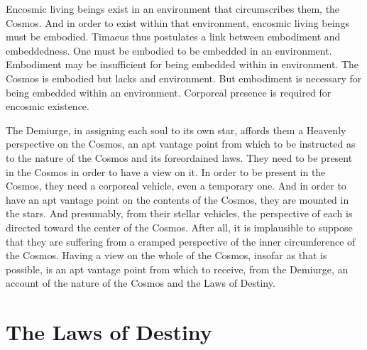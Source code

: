 Encosmic living beings exist in an environment that circumscribes them, the Cosmos. And in order to exist within that environment, encosmic living beings must be embodied. Timaeus thus postulates a link between embodiment and embeddedness. One must be embodied to be embedded in an environment. Embodiment may be insufficient for being embedded within in environment. The Cosmos is embodied but lacks and environment. But embodiment is necessary for being embedded within an environment. Corporeal presence is required for encosmic existence.

The Demiurge, in assigning each soul to its own star, affords them a Heavenly perspective on the Cosmos, an apt vantage point from which to be instructed as to the nature of the Cosmos and its foreordained laws. They need to be present in the Cosmos in order to have a view on it. In order to be present in the Cosmos, they need a corporeal vehicle, even a temporary one. And in order to have an apt vantage point on the contents of the Cosmos, they are mounted in the stars. And presumably, from their stellar vehicles, the perspective of each is directed toward the center of the Cosmos. After all, it is implausible to suppose that they are suffering from a cramped perspective of the inner circumference of the Cosmos. Having a view on the whole of the Cosmos, insofar as that is possible, is an apt vantage point from which to receive, from the Demiurge, an account of the nature of the Cosmos and the Laws of Destiny.


\section{The Laws of Destiny} %
\label{sec:the_laws_of_destiny}

